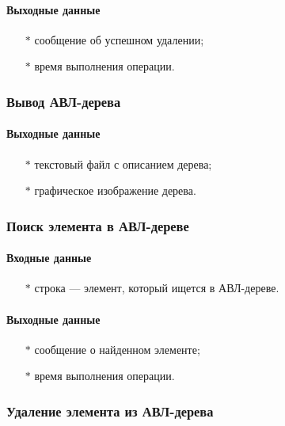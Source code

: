 \documentclass[a4paper,12pt]{extarticle}
\begin{document}
\paragraph{Выходные данные}
\begin{itemize}
    \item[$*$] сообщение об успешном удалении;
    \item[$*$] время выполнения операции.
\end{itemize}

\subsubsection{Вывод АВЛ-дерева}

\paragraph{Выходные данные}
\begin{itemize}
    \item[$*$] текстовый файл с описанием дерева;
    \item[$*$] графическое изображение дерева.
\end{itemize}


\subsubsection{Поиск элемента в АВЛ-дереве}

\paragraph{Входные данные}
\begin{itemize}
    \item[$*$] строка --- элемент, который ищется в АВЛ-дереве.
\end{itemize}

\paragraph{Выходные данные}
\begin{itemize}
    \item[$*$] сообщение о найденном элементе;
    \item[$*$] время выполнения операции.
\end{itemize}

\subsubsection{Удаление элемента из АВЛ-дерева}
\end{document}
